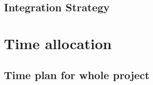 \documentclass[xcolor=pdftex,dvipsnames,table]{beamer}
\begin{document}
\subsection{Integration Strategy}


\section{Time allocation}
  \subsection{Time plan for whole project}
  
\end{document}
